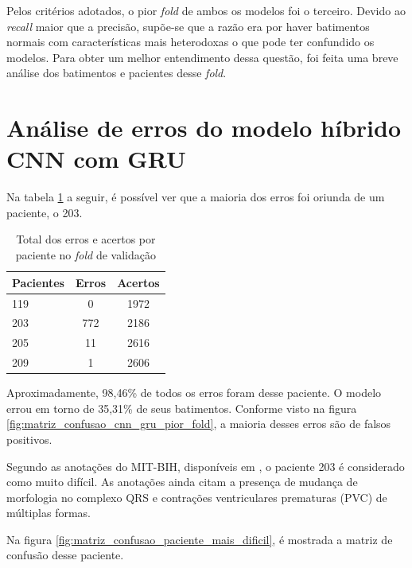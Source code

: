 Pelos critérios adotados, o pior \textit{fold} de ambos os modelos foi o terceiro. Devido ao \textit{recall} maior que a precisão, supõe-se que 
a razão era por haver batimentos normais com características mais heterodoxas o que pode ter confundido os modelos. Para obter um melhor entendimento
dessa questão, foi feita uma breve análise dos batimentos e pacientes desse \textit{fold}. 

\section{Análise de erros do modelo híbrido CNN com GRU}
\label{sec:analise_erros_cnn_gru}

Na tabela \ref{tab:erros_acertos_por_paciente} a seguir, é possível ver que a maioria dos erros foi oriunda de um paciente, o 203.

\begin{table}[H]
\centering
\caption{Total dos erros e acertos por paciente no \textit{fold} de validação}
\label{tab:erros_acertos_por_paciente}
\begin{tabular}{lcc}
\hline
\textbf{Pacientes} & \textbf{Erros} & \textbf{Acertos}\\
\hline
119 & 0 &  1972 \\
203 & 772  & 2186\\
205 & 11 & 2616\\
209 & 1 & 2606\\
\hline
\end{tabular}
\end{table}

Aproximadamente, 98,46\% de todos os erros foram desse paciente. O modelo errou em torno de 35,31\% de seus batimentos. Conforme visto na 
figura \ref{fig:matriz_confusao_cnn_gru_pior_fold}, a maioria desses erros são de falsos positivos.

Segundo as anotações do MIT-BIH, disponíveis em \cite{physionet_annotations}, o paciente 203 é considerado como muito difícil. As anotações ainda citam
a presença de mudança de morfologia no complexo QRS e contrações ventriculares prematuras (PVC) de múltiplas formas.

Na figura \ref{fig:matriz_confusao_paciente_mais_dificil}, é mostrada a matriz de confusão desse paciente.

